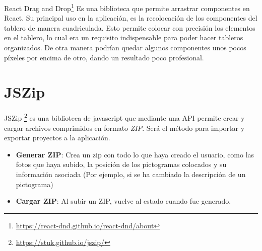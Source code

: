 React Drag and Drop\footnote{\url{https://react-dnd.github.io/react-dnd/about}} Es una biblioteca que permite arrastrar componentes en React. Su principal uso en la aplicación, es la recolocación de los componentes del tablero de manera cuadriculada. Esto permite colocar con precisión los elementos en el tablero, lo cual era un requisito indispensable para poder hacer tableros organizados. De otra manera podrían quedar algunos componentes unos pocos píxeles por encima de otro, dando un resultado poco profesional.

\section{JSZip}

JSZip \footnote{\url{https://stuk.github.io/jszip/}} es una biblioteca de javascript que mediante una API permite crear y cargar archivos comprimidos en formato \textit{ZIP}. Será el método para importar y exportar proyectos a la aplicación.
\begin{itemize}
	\item \textbf{Generar ZIP}: Crea un zip con todo lo que haya creado el usuario, como las fotos que haya subido, la posición de los pictogramas colocados y su información asociada (Por ejemplo, si se ha cambiado la descripción de un pictograma)
	\item \textbf{Cargar ZIP}: Al subir un ZIP, vuelve al estado cuando fue generado.
\end{itemize}	